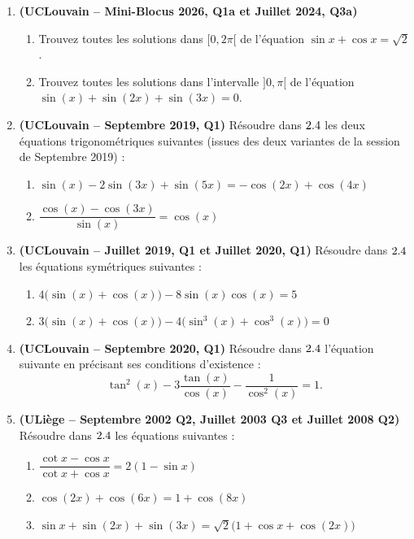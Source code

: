 \begin{enumerate}[label=\textbf{Exercice 3.\arabic* --}, align=left, leftmargin=*]
    \item \textbf{(UCLouvain -- Mini-Blocus 2026, Q1a et Juillet 2024, Q3a)}
    \begin{enumerate}
        \item Trouvez toutes les solutions dans $[0, 2\pi[$ de l'équation $\sin x + \cos x = \sqrt{2}$.
        \item Trouvez toutes les solutions dans l'intervalle $]0, \pi[$ de l'équation $\sin(x) + \sin(2x) + \sin(3x) = 0$.
    \end{enumerate}

    \item \textbf{(UCLouvain -- Septembre 2019, Q1)} Résoudre dans $2.4$ les deux équations trigonométriques suivantes (issues des deux variantes de la session de Septembre 2019) :
    \begin{enumerate}
        \item $\sin(x) - 2\sin(3x) + \sin(5x) = -\cos(2x) + \cos(4x)$
        \item $\dfrac{\cos(x) - \cos(3x)}{\sin(x)} = \cos(x)$
    \end{enumerate}

    \item \textbf{(UCLouvain -- Juillet 2019, Q1 et Juillet 2020, Q1)} Résoudre dans $2.4$ les équations symétriques suivantes :
    \begin{enumerate}
        \item $4\bigl(\sin(x) + \cos(x)\bigr) - 8\sin(x)\cos(x) = 5$
        \item $3\bigl(\sin(x) + \cos(x)\bigr) - 4\bigl(\sin^3(x) + \cos^3(x)\bigr) = 0$
    \end{enumerate}

    \item \textbf{(UCLouvain -- Septembre 2020, Q1)} Résoudre dans $2.4$ l'équation suivante en précisant ses conditions d'existence :
    \[
        \tan^2(x) - 3\frac{\tan(x)}{\cos(x)} - \frac{1}{\cos^2(x)} = 1.
    \]

    \item \textbf{(ULiège -- Septembre 2002 Q2, Juillet 2003 Q3 et Juillet 2008 Q2)} Résoudre dans $2.4$ les équations suivantes :
    \begin{enumerate}
        \item $\dfrac{\cot x - \cos x}{\cot x + \cos x} = 2(1 - \sin x)$
        \item $\cos(2x) + \cos(6x) = 1 + \cos(8x)$
        \item $\sin x + \sin(2x) + \sin(3x) = \sqrt{2}\bigl(1 + \cos x + \cos(2x)\bigr)$
    \end{enumerate}


\end{enumerate}

